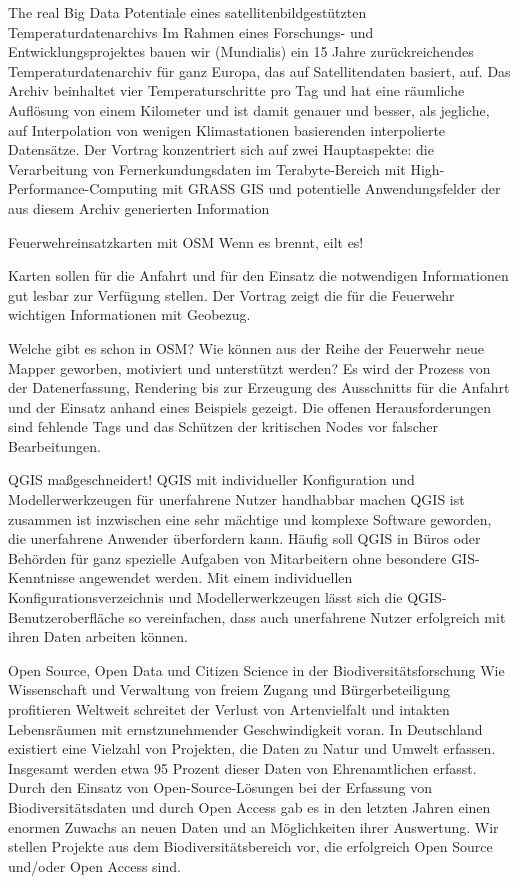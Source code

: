 %
{The real Big Data}
{Potentiale eines satellitenbildgestützten Temperaturdatenarchivs}%
{Im Rahmen eines Forschungs- und Entwicklungsprojektes bauen wir (Mundialis) ein 15 Jahre
  zurückreichendes Temperaturdatenarchiv für ganz Europa, das auf Satellitendaten basiert, auf.
  Das Archiv beinhaltet vier Temperaturschritte pro Tag und hat eine räumliche Auflösung von einem
  Kilometer und ist damit genauer und besser, als jegliche, auf Interpolation von wenigen
  Klimastationen basierenden interpolierte Datensätze.
  Der Vortrag konzentriert sich auf zwei Hauptaspekte: die
  Verarbeitung von Fernerkundungsdaten im Terabyte-Bereich mit High-Performance-Computing mit
  GRASS GIS und potentielle Anwendungsfelder der aus diesem Archiv generierten Information}

%
{Feuerwehreinsatzkarten mit OSM}%
{Wenn es brennt, eilt es!}%
{Karten sollen für die
  Anfahrt und für den Einsatz die notwendigen Informationen gut lesbar zur Verfügung stellen.
Der Vortrag zeigt die für die Feuerwehr wichtigen Informationen mit Geobezug.

Welche gibt es schon
in OSM? Wie können aus der Reihe der Feuerwehr neue Mapper geworben, motiviert und unterstützt
werden?  Es wird der Prozess von der Datenerfassung, Rendering bis zur Erzeugung des Ausschnitts für
die
Anfahrt und der Einsatz anhand eines Beispiels gezeigt. Die offenen Herausforderungen sind fehlende
Tags und das Schützen der kritischen Nodes vor falscher Bearbeitungen.}

%
{QGIS maßgeschneidert!}%
{QGIS mit individueller Konfiguration und Modellerwerkzeugen für unerfahrene Nutzer handhabbar machen}%
{QGIS ist zusammen ist inzwischen eine sehr mächtige und komplexe Software geworden, die unerfahrene
  Anwender überfordern kann.  Häufig soll QGIS in Büros oder Behörden für ganz spezielle Aufgaben
  von Mitarbeitern ohne besondere
GIS-Kenntnisse angewendet werden.  Mit einem individuellen Konfigurationsverzeichnis und
Modellerwerkzeugen lässt sich die QGIS-Benutzeroberfläche so vereinfachen, dass auch unerfahrene
Nutzer erfolgreich mit ihren Daten arbeiten können. 
}

%
{Open Source, Open Data und Citizen Science in der Biodiversitätsforschung}%
{Wie Wissenschaft und Verwaltung von freiem Zugang und Bürgerbeteiligung profitieren}%
{Weltweit schreitet der Verlust von Artenvielfalt und intakten Lebensräumen mit ernstzunehmender
Geschwindigkeit voran. In Deutschland existiert eine Vielzahl von Projekten, die Daten zu Natur und
Umwelt erfassen. Insgesamt werden etwa 95 Prozent dieser Daten von Ehrenamtlichen erfasst.  Durch
den Einsatz von Open-Source-Lösungen bei der Erfassung von Biodiversitätsdaten und durch Open Access
gab es in den letzten Jahren einen enormen Zuwachs an neuen Daten und an Möglichkeiten ihrer
Auswertung. Wir stellen Projekte aus dem Biodiversitätsbereich vor, die erfolgreich Open Source
und/oder Open Access sind.}

